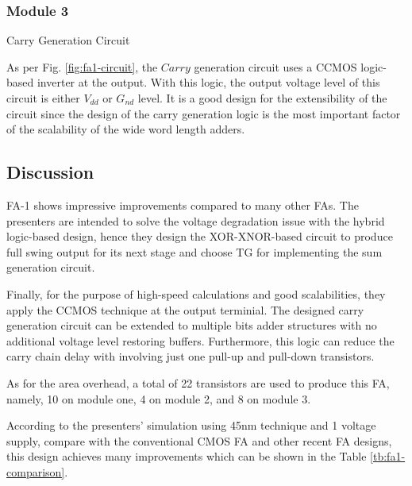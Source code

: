 \documentclass[conference]{IEEEtran}
\begin{document}
\subsubsection{Module 3}Carry Generation Circuit

As per Fig. \ref{fig:fa1-circuit}, the \(Carry\) generation circuit uses a CCMOS logic-based inverter at the output.
With this logic, the output voltage level of this circuit is either \(V_{dd}\) or \(G_{nd}\) level.
It is a good design for the extensibility of the circuit
since the design of the carry generation logic is the most important factor of the scalability of the wide word length adders.


\subsection{Discussion}

FA-1 shows impressive improvements compared to many other FAs.
The presenters are intended to solve the voltage degradation issue with the hybrid logic-based design,
hence they design the XOR-XNOR-based circuit to produce full swing output for its next stage
and choose TG for implementing the sum generation circuit.

Finally, for the purpose of high-speed calculations and good scalabilities,
they apply the CCMOS technique at the output terminial.
The designed carry generation circuit can be extended to multiple bits adder structures with no additional voltage level restoring buffers.
Furthermore, this logic can reduce the carry chain delay with involving just one pull-up and pull-down transistors.

As for the area overhead, a total of 22 transistors are used to produce this FA, namely, 10 on module one, 4 on module 2, and 8 on module 3.

According to the presenters' simulation using 45nm technique and 1 voltage supply, compare with the conventional CMOS FA\cite{weste2015cmos} and other recent FA designs\cite{9068497,18743001},
this design achieves many improvements which can be shown in the Table \ref{tb:fa1-comparison}.
\end{document}
